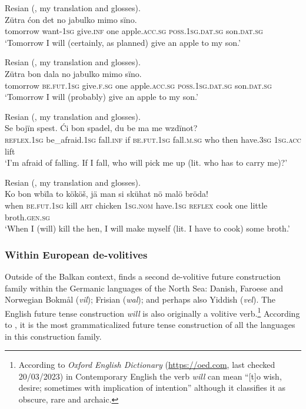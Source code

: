 \documentclass[output=paper,colorlinks,citecolor=brown]{langscibook}
\begin{document}
\ea \label{ex:roncero:25}
    Resian \citeauthor{Pila2022} (\citeyear[36]{Pila2022}, my translation and glosses).\\
    \gll Zütra ćon det no jabulko mimo sïno.\\
    tomorrow want-\textsc{1sg} give.\textsc{inf} one apple.\textsc{acc.sg} \textsc{poss.1sg.dat.sg} son.\textsc{dat.sg} \\
    \glt ‘Tomorrow I will (certainly, as planned) give an apple to my son.’
\z

\ea \label{ex:roncero:26}
    Resian \citeauthor{Pila2022} (\citeyear[36]{Pila2022}, my translation and glosses).\\
    \gll Zütra bon dala no jabulko mimo sïno.\\
    tomorrow \textsc{be.fut.1sg} give.\textsc{f.sg} one apple.\textsc{acc.sg} \textsc{poss.1sg.dat.sg} son.\textsc{dat.sg} \\
    \glt ‘Tomorrow I will (probably) give an apple to my son.’
\z

\ea \label{ex:roncero:27}
    Resian \citeauthor{Pila2022} (\citeyear[45]{Pila2022}, my translation and glosses).\\
    \gll Se bojïn spest. Ći bon spadel, du be ma me wzdïnot?\\
    \textsc{reflex}.\textsc{1sg} be\_afraid.\textsc{1sg} fall.\textsc{inf} if \textsc{be.fut.1sg} fall.\textsc{m.sg} who then have.\textsc{3sg} \textsc{1sg.acc} lift \\
    \glt ‘I'm afraid of falling. If I fall, who will pick me up (lit. who has to carry me)?’
\z

\ea \label{ex:roncero:28}
    Resian \citeauthor{Pila2022} (\citeyear[41]{Pila2022}, my translation and glosses).\\
    \gll Ko bon wbïla to kököš, jä man si skühat nö malö bröda!\\
    when \textsc{be.fut.1sg} kill \textsc{art} chicken \textsc{1sg.nom} have.\textsc{1sg} \textsc{reflex} cook one little broth.\textsc{gen.sg} \\
    \glt ‘When I (will) kill the hen, I will make myself (lit. I have to cook) some broth.’
\z

\subsubsection{Within European de-volitives} \label{sec:roncero:3.2.2}
Outside of the Balkan context, \citet[322]{Dahl2000b} finds a second de-volitive future construction family within the Germanic languages of the North Sea: Danish, Faroese and Norwegian Bokmål (\textit{vil}); Frisian (\textit{wal}); and perhaps also Yiddish (\textit{vel}). The English future tense construction \textit{will} is also originally a volitive verb.\footnote{According to \textit{Oxford English Dictionary} (\url{https://oed.com}, last checked 20/03/2023) in Contemporary English the verb \textit{will }can mean “[t]o wish, desire; sometimes with implication of intention” although it classifies it as obscure, rare and archaic.} According to \citet[322]{Dahl2000b}, it is the most grammaticalized future tense construction of all the languages in this construction family.
\end{document}
